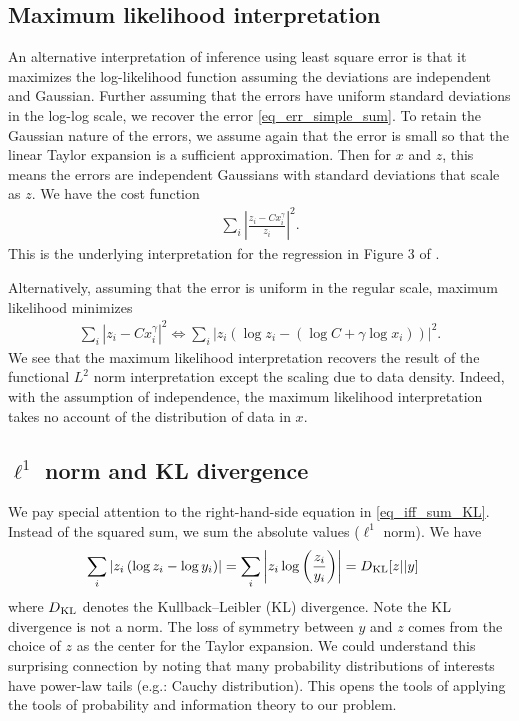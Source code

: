 \documentclass[11pt,letterpaper]{article}
\begin{document}
\subsection{Maximum likelihood interpretation}
An alternative interpretation of inference using least square error is that it maximizes the log-likelihood function assuming the deviations are independent and Gaussian. Further assuming that the errors have uniform standard deviations in the log-log scale, we recover the error \eqref{eq_err_simple_sum}. To retain the Gaussian nature of the errors, we assume again that the error is small so that the linear Taylor expansion is a sufficient approximation. Then for $x$ and $z$, this means the errors are independent Gaussians with standard deviations that scale as $z$. We have the cost function
\begin{align}
    \sum_i \left|\frac{z_i-Cx_i^\gamma}{z_i}\right|^2.
\end{align}
This is the underlying interpretation for the regression in Figure 3 of \cite{DuBuhler_23}.

Alternatively, assuming that the error is uniform in the regular scale, maximum likelihood minimizes
\begin{align}
    \sum_i \left|z_i-Cx_i^\gamma\right|^2 \iff \sum_i \left| z_i\left(\log z_i- (\log C+\gamma \log x_i)\right) \right|^2.\label{eq_iff_sum_KL}
\end{align}
We see that the maximum likelihood interpretation recovers the result of the functional $L^2$ norm interpretation except the scaling due to data density. Indeed, with the assumption of independence, the maximum likelihood interpretation takes no account of the distribution of data in $x$.

\subsection{$\ell^1$ norm and KL divergence}
We pay special attention to the right-hand-side equation in \eqref{eq_iff_sum_KL}. Instead of the squared sum, we sum the absolute values ($\ell^1$ norm). We have
\begin{align*}
    \sum_i \left| z_i\left(\log z_i- \log y_i\right) \right| &= \sum_i \left| z_i \log\left( \frac{z_i}{y_i}  \right) \right| = D\textsubscript{KL}[z||y]
\end{align*}
where $D\textsubscript{KL}$ denotes the Kullback–Leibler (KL) divergence. Note the KL divergence is not a norm. The loss of symmetry between $y$ and $z$ comes from the choice of $z$ as the center for the Taylor expansion. We could understand this surprising connection by noting that many probability distributions of interests have power-law tails (e.g.: Cauchy distribution). This opens the tools of applying the tools of probability and information theory to our problem.
\end{document}
